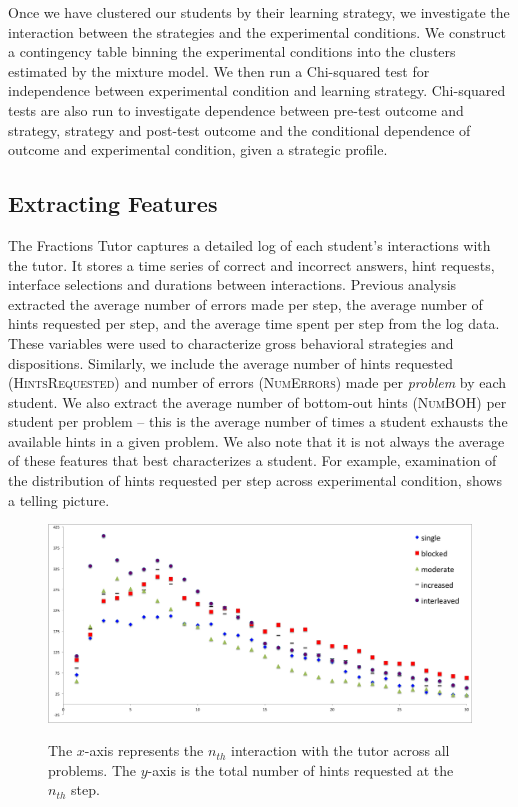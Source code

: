 \documentclass{edm_template}
\newcommand{\ftr}[1]{\textsc{#1}}
\begin{document}
Once we have clustered our students by their learning strategy, we investigate the interaction between the strategies and the experimental conditions. We construct a contingency table binning the experimental conditions into the clusters estimated by the mixture model. We then run a Chi-squared test for independence between experimental condition and learning strategy. Chi-squared tests are also run to investigate dependence between pre-test outcome and strategy, strategy and post-test outcome and the conditional dependence of outcome and experimental condition, given a strategic profile.

\subsection{Extracting Features}
The Fractions Tutor captures a detailed log of each student's interactions with the tutor. It stores a time series of correct and incorrect answers, hint requests, interface selections and durations between interactions. Previous analysis \cite{Rau2012} extracted the average number of errors made per step, the average number of hints requested per step, and the average time spent per step from the log data. These variables were used to characterize gross behavioral strategies and dispositions. Similarly, we include the average number of hints requested (\ftr{HintsRequested}) and number of errors (\ftr{NumErrors}) made per \emph{problem} by each student. We also extract the average number of bottom-out hints (\ftr{NumBOH}) per student per problem -- this is the average number of times a student exhausts the available hints in a given problem. We also note that it is not always the average of these features that best characterizes a student. For example, examination of the distribution of hints requested per step across experimental condition, shows a telling picture.
\begin{figure}[t!]
\centering
\includegraphics[scale=.48]{hintsByStep2.png}\\
\caption{The $x$-axis represents the $n_{th}$ interaction with the tutor across all problems. The $y$-axis is the total number of hints requested at the $n_{th}$ step.  }
\label{fig:hints-geom}
\end{figure}
\end{document}
